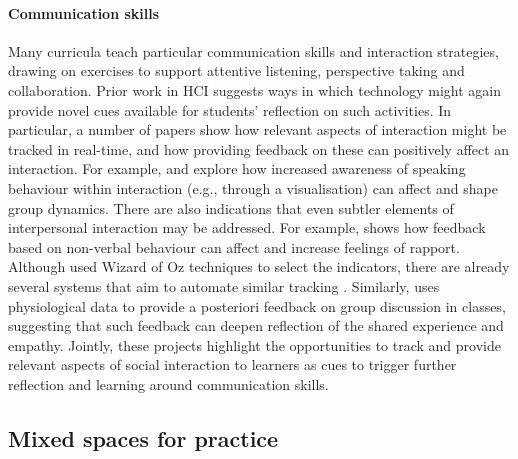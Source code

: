 \documentclass[prodmode,acmtochi]{acmsmall}
\newcommand{\todolater}[1]{}
\begin{document}
\paragraph{Communication skills}
\label{sec:strategies}
Many curricula teach particular communication skills and interaction strategies, drawing on exercises to support attentive listening, perspective taking and collaboration. 
%
Prior work in HCI suggests ways in which technology might again provide novel cues available for students' reflection on such activities. In particular, a number of papers show how relevant aspects of interaction might be tracked in real-time, and how providing feedback on these can positively affect an interaction. For example,   and  explore how increased awareness of speaking behaviour within interaction (e.g., through a visualisation) can affect and shape group dynamics. 
There are also indications that even subtler elements of interpersonal interaction may be addressed. For example,  shows how feedback based on non-verbal behaviour can affect and increase feelings of rapport. Although  used Wizard of Oz techniques to select the indicators, there are already several systems that aim to automate similar tracking \cite{Sun2011,Hagad2011}. Similarly,  uses physiological data to provide a posteriori feedback on group discussion in classes, suggesting that such feedback can deepen reflection of the shared experience and empathy. 
%
Jointly, these projects highlight the opportunities to track and provide relevant aspects of social interaction to learners as cues to trigger further reflection and learning around communication skills. 
\todolater{???but could also serve as a scaffolding to promote deeper discussion with the group, cf. Section~\ref{sec:socialReflection} below.}






\subsection{Mixed spaces for practice}
\label{sec:mixedSpaces}
\end{document}
